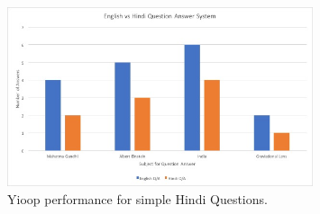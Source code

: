 \begin{figure}[htb]
\centering
\includegraphics[width=0.8\textwidth]{images/QA_performance3.jpg}
\caption{Yioop performance for simple Hindi Questions.} 
\label{fig:QA_performance3}
\end{figure}